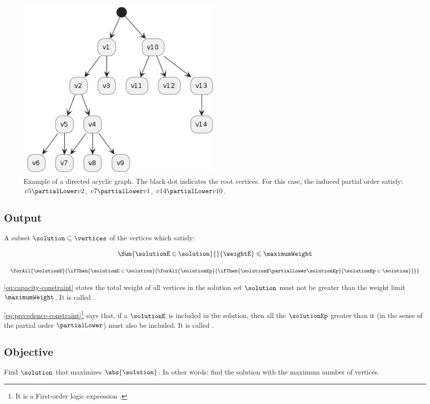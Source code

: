 \begin{figure}[ht!]
    \centering
    \includegraphics[width=0.5\textwidth]{images/directed acyclic graph.png}
    \caption{Example of a directed acyclic graph. The black dot indicates the root vertices. For this case, the induced partial order satisfy: $v5 \partialLower v2$, $v7 \partialLower v1$, $v14 \partialLower v10$.}
\end{figure}

\subsection{Output}

A subset $\solution \subseteq \vertices$ of the vertices which satisfy:

\begin{equation}
    \label{eq:capacity-constraint}
    \Sum
        {\solutionE \in \solution}
        {}
        {\weightE}
    \leqslant
    \maximumWeight
\end{equation}

\begin{equation}
    \label{eq:precedence-constraint}
    \forAll
        {\solutionE}
        {\ifThen
            {\solutionE \in \solution}
            {\forAll
                {\solutionEp}
                {\ifThen
                    {\solutionE \partialLower \solutionEp}
                    {\solutionEp \in \solution}
                }
            }
        }
\end{equation}

\eqref{eq:capacity-constraint} states the total weight of all vertices in the solution set $\solution$ must not be greater than the weight limit $\maximumWeight$. It is called \capacityConstraint.

\eqref{eq:precedence-constraint}\footnote{It is a First-order logic expression \cite{bib:logic}.} says that, if a $\solutionE$ is included in the solution, then all the $\solutionEp$ greater than it (in the sense of the partial order $\partialLower$) must also be included. It is called \precedenceConstraint.

\subsection{Objective}

Find $\solution$ that maximizes $\abs{\solution}$. In other words: find the solution with the maximum number of vertices.
